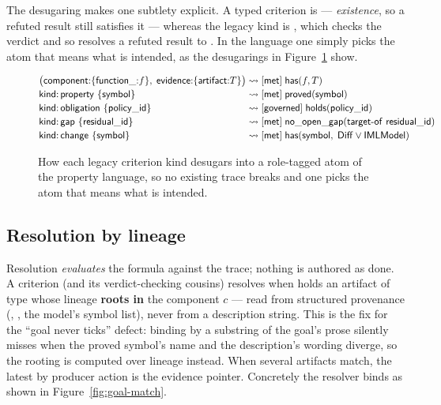 The desugaring makes one subtlety explicit. A typed  criterion is
 --- \emph{existence}, so a refuted result still satisfies it --- whereas the legacy
 kind is , which checks the verdict and so resolves a refuted result to
. In the language one simply picks the atom that means what is intended, as the
desugarings in Figure~\ref{fig:goal-desugaring} show.

\begin{figure}[H]
\centering
\small
\[
\begin{array}{@{}l@{\;\rightsquigarrow\;}l@{}}
\big(\id{component}{:}\{\id{function\_}{:}f\},\; \id{evidence}{:}\{\id{artifact}{:}T\}\big) & [\id{met}]\; \id{has}(f, T)\\[2pt]
\id{kind}{:}\,\id{property}\ \{\id{symbol}\}      & [\id{met}]\; \id{proved}(\id{symbol})\\[2pt]
\id{kind}{:}\,\id{obligation}\ \{\id{policy\_id}\} & [\id{governed}]\; \id{holds}(\id{policy\_id})\\[2pt]
\id{kind}{:}\,\id{gap}\ \{\id{residual\_id}\}      & [\id{met}]\; \id{no\_open\_gap}(\id{target\text{-}of}\ \id{residual\_id})\\[2pt]
\id{kind}{:}\,\id{change}\ \{\id{symbol}\}         & [\id{met}]\; \id{has}(\id{symbol},\; \id{Diff} \lor \id{IMLModel})
\end{array}
\]
\caption{How each legacy criterion kind desugars into a role-tagged atom of the property language, so no existing trace breaks and one picks the atom that means what is intended.}
\label{fig:goal-desugaring}
\end{figure}

\subsection{Resolution by lineage}\label{sec:goals-resolution}

Resolution \emph{evaluates} the formula against the trace; nothing is authored as done. A criterion
 (and its verdict-checking cousins) resolves  when \trace{} holds an
artifact of type  whose lineage \textbf{roots in} the component $c$ --- read from structured
provenance (, , the model's symbol list), never from a
description string. This is the fix for the ``goal never ticks'' defect: binding by a substring of the
goal's prose silently misses when the proved symbol's name and the description's wording diverge, so the
rooting is computed over lineage instead. When several artifacts match, the latest by producer action is
the evidence pointer. Concretely the resolver binds as shown in Figure~\ref{fig:goal-match}.

